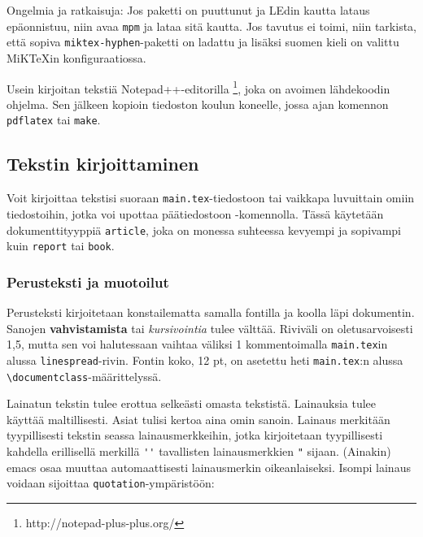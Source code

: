 Ongelmia ja ratkaisuja: Jos paketti on puuttunut ja LEdin kautta
lataus epäonnistuu, niin avaa \verb!mpm! ja lataa sitä kautta.  Jos
tavutus ei toimi, niin tarkista, että sopiva
\verb!miktex-hyphen!-paketti on ladattu ja lisäksi suomen kieli on
valittu MiKTeXin konfiguraatiossa.

Usein kirjoitan tekstiä Notepad++-editorilla%
\footnote{http://notepad-plus-plus.org/}, joka on avoimen lähdekoodin
ohjelma. Sen jälkeen kopioin tiedoston koulun koneelle, jossa ajan
komennon \verb!pdflatex! tai \verb!make!.

\subsection{Tekstin kirjoittaminen}
\label{sec:esimmuotoilut}

Voit kirjoittaa tekstisi suoraan \verb!main.tex!-tiedostoon tai
vaikkapa luvuittain omiin tiedostoihin, jotka voi upottaa
päätiedostoon \verb!!-komennolla. Tässä käytetään
dokumenttityyppiä \verb!article!, joka on monessa suhteessa kevyempi
ja sopivampi kuin \verb!report! tai \verb!book!.


\subsubsection{Perusteksti ja muotoilut}

\begin{sloppypar}
Perusteksti kirjoitetaan konstailematta samalla fontilla ja koolla
läpi dokumentin. Sanojen \textbf{vahvistamista} tai
\textit{kursivointia} tulee välttää.  Riviväli on oletusarvoisesti
1,5, mutta sen voi halutessaan vaihtaa väliksi 1 kommentoimalla
\verb!main.tex!in alussa \verb!linespread!-rivin.  Fontin koko, 12 pt,
on asetettu heti \verb!main.tex!:n alussa
\verb!\documentclass!-määrittelyssä.
\end{sloppypar}


Lainatun tekstin tulee erottua selkeästi omasta tekstistä. Lainauksia
tulee käyttää maltillisesti. Asiat tulisi kertoa aina omin
sanoin. Lainaus merkitään tyypillisesti tekstin seassa
lainausmerkkeihin, jotka kirjoitetaan tyypillisesti kahdella
erillisellä merkillä \verb!''! tavallisten lainausmerkkien \verb!"!
sijaan. (Ainakin) emacs osaa muuttaa automaattisesti lainausmerkin
oikeanlaiseksi. Isompi lainaus voidaan sijoittaa
\verb!quotation!-ympäristöön:

